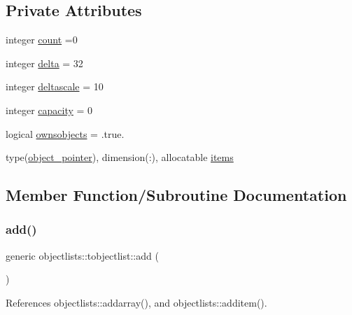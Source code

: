 \subsection*{Private Attributes}
\begin{DoxyCompactItemize}
\item 
integer \mbox{\hyperlink{structobjectlists_1_1tobjectlist_ae2cf4d009a825d753ff640ec0227e351}{count}} =0
\item 
integer \mbox{\hyperlink{structobjectlists_1_1tobjectlist_a90ce130b573d17773ec5205b6196b2c6}{delta}} = 32
\item 
integer \mbox{\hyperlink{structobjectlists_1_1tobjectlist_a4113fb6e6d3ce9e02c4e66aa2ea8b3cc}{deltascale}} = 10
\item 
integer \mbox{\hyperlink{structobjectlists_1_1tobjectlist_ad9cecdd445bf8b3ee7510974cacea738}{capacity}} = 0
\item 
logical \mbox{\hyperlink{structobjectlists_1_1tobjectlist_ab089fe989e42aa770260adff8c4b8d13}{ownsobjects}} = .true.
\item 
type(\mbox{\hyperlink{structobjectlists_1_1object__pointer}{object\+\_\+pointer}}), dimension(\+:), allocatable \mbox{\hyperlink{structobjectlists_1_1tobjectlist_a6a7277796208d0428dde76a6e9524ada}{items}}
\end{DoxyCompactItemize}


\subsection{Member Function/\+Subroutine Documentation}
\mbox{\label{structobjectlists_1_1tobjectlist_a4239d36f00d83e31e90be3277d604978}} 
\subsubsection{\texorpdfstring{add()}{add()}}
{\footnotesize\ttfamily generic objectlists\+::tobjectlist\+::add (\begin{DoxyParamCaption}{ }\end{DoxyParamCaption})\hspace{0.3cm}{\ttfamily [private]}}



References objectlists\+::addarray(), and objectlists\+::additem().

